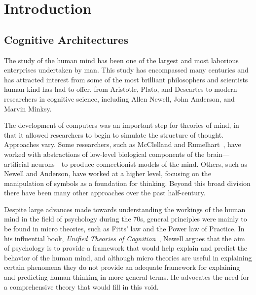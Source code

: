 \chapter{Introduction}
\label{chap-one}


\section {Cognitive Architectures}
\label{introCogArch}
The study of the human mind has been one of the largest and most
laborious enterprises undertaken by man. This study has encompassed
many centuries and has attracted interest from some of the most
brilliant philosophers and scientists human kind has had to offer,
from Aristotle, Plato, and Descartes to modern researchers in
cognitive science, including Allen Newell, John Anderson, and Marvin
Minksy.

The development of computers was an important step for theories of
mind, in that it allowed researchers to begin to simulate the
structure of thought.  Approaches vary.  Some researchers, such as
McClelland and Rumelhart~\cite{rumelhart1986researchv1,rumelhart1986researchv2}, have worked with
abstractions of low-level biological components of the
brain---artificial neurons---to produce connectionist models of the
mind.
Others, such as Newell and Anderson, have worked at a higher level, focusing
on the manipulation of symbols as a foundation for thinking.  Beyond
this broad division there have been many other approaches over the
past half-century.

Despite large advances made towards understanding the workings of
the human mind in the field of psychology during the 70s, general
principles were mainly to be found in micro theories, such as Fitts'
law and the Power law of Practice.
In his influential book, {\em Unified Theories of
  Cognition}~\cite{Newell:1990aa}, Newell argues that the aim of
psychology is to provide a framework that would help explain and
predict the behavior of the human mind, and although micro theories
are useful in explaining certain phenomena they do not provide an
adequate framework for explaining and predicting human thinking in
more general terms.  He advocates the need for a comprehensive theory
that would fill in this void.


